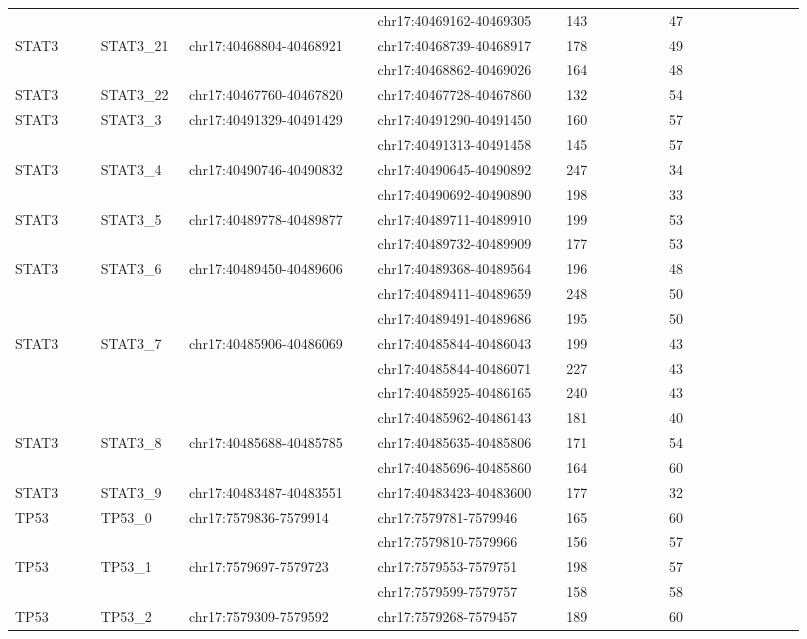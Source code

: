 \begin{landscape}
\begin{longtable}{p{0.1\linewidth}|p{0.1\linewidth}p{0.22\linewidth}p{0.22\linewidth}p{0.12\linewidth}p{0.16\linewidth}}
\\
 & & & chr17:40469162-40469305 & 143 & 47
\\
STAT3 & STAT3\_21 & chr17:40468804-40468921 & chr17:40468739-40468917 & 178 & 49
\\
 & & & chr17:40468862-40469026 & 164 & 48
\\
STAT3 & STAT3\_22 & chr17:40467760-40467820 & chr17:40467728-40467860 & 132 & 54
\\
STAT3 & STAT3\_3 & chr17:40491329-40491429 & chr17:40491290-40491450 & 160 & 57
\\
 & & & chr17:40491313-40491458 & 145 & 57
\\
STAT3 & STAT3\_4 & chr17:40490746-40490832 & chr17:40490645-40490892 & 247 & 34
\\
 & & & chr17:40490692-40490890 & 198 & 33
\\
STAT3 & STAT3\_5 & chr17:40489778-40489877 & chr17:40489711-40489910 & 199 & 53
\\
 & & & chr17:40489732-40489909 & 177 & 53
\\
STAT3 & STAT3\_6 & chr17:40489450-40489606 & chr17:40489368-40489564 & 196 & 48
\\
 & & & chr17:40489411-40489659 & 248 & 50
\\
 & & & chr17:40489491-40489686 & 195 & 50
\\
STAT3 & STAT3\_7 & chr17:40485906-40486069 & chr17:40485844-40486043 & 199 & 43
\\
 & & & chr17:40485844-40486071 & 227 & 43
\\
 & & & chr17:40485925-40486165 & 240 & 43
\\
 & & & chr17:40485962-40486143 & 181 & 40
\\
STAT3 & STAT3\_8 & chr17:40485688-40485785 & chr17:40485635-40485806 & 171 & 54
\\
 & & & chr17:40485696-40485860 & 164 & 60
\\
STAT3 & STAT3\_9 & chr17:40483487-40483551 & chr17:40483423-40483600 & 177 & 32
\\
\hline
TP53 & TP53\_0 & chr17:7579836-7579914 & chr17:7579781-7579946 & 165 & 60
\\
 & & & chr17:7579810-7579966 & 156 & 57
\\
TP53 & TP53\_1 & chr17:7579697-7579723 & chr17:7579553-7579751 & 198 & 57
\\
 & & & chr17:7579599-7579757 & 158 & 58
\\
TP53 & TP53\_2 & chr17:7579309-7579592 & chr17:7579268-7579457 & 189 & 60
\\

\end{longtable}
\end{landscape}
